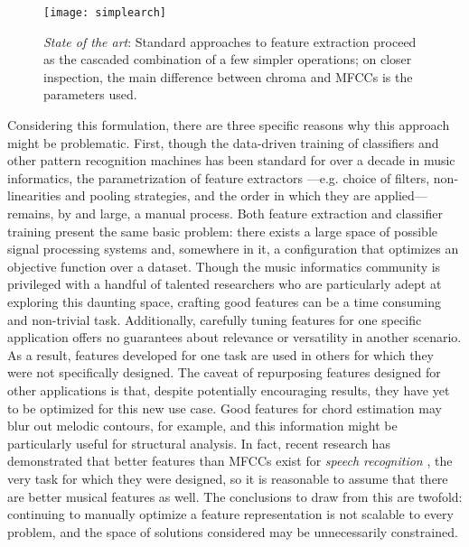 \begin{figure}[t]
\begin{centering}
\texttt{[image: simplearch]}
\caption{\emph{State of the art}: Standard approaches to feature extraction proceed as the cascaded combination of a few simpler operations; on closer inspection, the main difference between chroma and MFCCs is the parameters used.}
\label{fig:simplearch}
\end{centering}
\end{figure}


Considering this formulation, there are three specific reasons why this approach might be problematic.
First, though the data-driven training of classifiers and other pattern recognition machines has been standard for over a decade in music informatics, the parametrization of feature extractors ---e.g. choice of filters, non-linearities and pooling strategies, and the order in which they are applied--- remains, by and large, a manual process.
Both feature extraction and classifier training present the same basic problem: there exists a large space of possible signal processing systems and, somewhere in it, a configuration that optimizes an objective function over a dataset.
Though the music informatics community is privileged with a handful of talented researchers who are particularly adept at exploring this daunting space, crafting good features can be a time consuming and non-trivial task.
Additionally, carefully tuning features for one specific application offers no guarantees about relevance or versatility in another scenario.
As a result, features developed for one task are used in others for which they were not specifically designed.
The caveat of repurposing features designed for other applications is that, despite potentially encouraging results, they have yet to be optimized for this new use case.
Good features for chord estimation may blur out melodic contours, for example, and this information might be particularly useful for structural analysis.
In fact, recent research has demonstrated that better features than MFCCs exist for \emph{speech recognition} \cite{Mohamed2011Deep}, the very task for which they were designed, so it is reasonable to assume that there are better musical features as well.
The conclusions to draw from this are twofold: continuing to manually optimize a feature representation is not scalable to every problem, and the space of solutions considered may be unnecessarily constrained.


